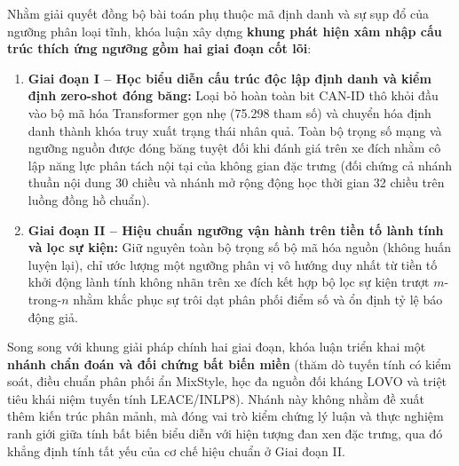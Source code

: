 \documentclass[12pt, a4paper, reqno, oneside]{book}
\begin{document}
Nhằm giải quyết đồng bộ bài toán phụ thuộc mã định danh và sự sụp đổ của ngưỡng phân loại tĩnh, khóa luận xây dựng \textbf{khung phát hiện xâm nhập cấu trúc thích ứng ngưỡng gồm hai giai đoạn cốt lõi}:
\begin{enumerate}
    \item \textbf{Giai đoạn I -- Học biểu diễn cấu trúc độc lập định danh và kiểm định zero-shot đóng băng:} Loại bỏ hoàn toàn bit CAN-ID thô khỏi đầu vào bộ mã hóa Transformer gọn nhẹ (75.298 tham số) và chuyển hóa định danh thành khóa truy xuất trạng thái nhân quả. Toàn bộ trọng số mạng và ngưỡng nguồn được đóng băng tuyệt đối khi đánh giá trên xe đích nhằm cô lập năng lực phân tách nội tại của không gian đặc trưng (đối chứng cả nhánh thuần nội dung 30 chiều và nhánh mở rộng động học thời gian 32 chiều trên luồng đồng hồ chuẩn).
    \item \textbf{Giai đoạn II -- Hiệu chuẩn ngưỡng vận hành trên tiền tố lành tính và lọc sự kiện:} Giữ nguyên toàn bộ trọng số bộ mã hóa nguồn (không huấn luyện lại), chỉ ước lượng một ngưỡng phân vị vô hướng duy nhất từ tiền tố khởi động lành tính không nhãn trên xe đích kết hợp bộ lọc sự kiện trượt $m$-trong-$n$ nhằm khắc phục sự trôi dạt phân phối điểm số và ổn định tỷ lệ báo động giả.
\end{enumerate}

Song song với khung giải pháp chính hai giai đoạn, khóa luận triển khai một \textbf{nhánh chẩn đoán và đối chứng bất biến miền} (thăm dò tuyến tính có kiểm soát, điều chuẩn phân phối ẩn MixStyle, học đa nguồn đối kháng LOVO và triệt tiêu khái niệm tuyến tính LEACE/INLP8). Nhánh này không nhằm đề xuất thêm kiến trúc phân mảnh, mà đóng vai trò kiểm chứng lý luận và thực nghiệm ranh giới giữa tính bất biến biểu diễn với hiện tượng đan xen đặc trưng, qua đó khẳng định tính tất yếu của cơ chế hiệu chuẩn ở Giai đoạn II.
\end{document}
